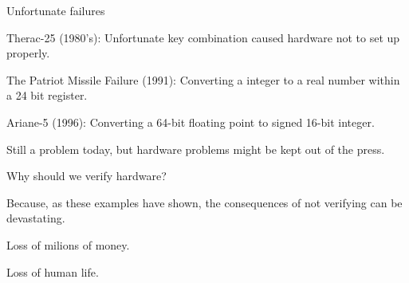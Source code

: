 \documentclass[11pt]{beamer}
\begin{document}
\begin{frame}{Unfortunate failures}
  \begin{block}{}
     Therac-25 (1980's): Unfortunate key combination caused hardware not to set up properly.
  \end{block}

  \pause

  \begin{block}{}
     The Patriot Missile Failure (1991): Converting a integer to a real number within a 24 bit register.
  \end{block}

  \pause

  \begin{block}{}
    Ariane-5 (1996): Converting a 64-bit floating point to signed 16-bit integer.
  \end{block}

  \pause

  \begin{block}{}
    Still a problem today, but hardware problems might be kept out of the press.
  \end{block}


\end{frame}


\begin{frame}{Why should we verify hardware?}
    \begin{block}{}
        Because, as these examples have shown, the consequences of not verifying can be devastating.
            \vspace{5mm}

        Loss of milions of money.
            \vspace{5mm}

        Loss of human life.
    \end{block}
\end{frame}
\end{document}
